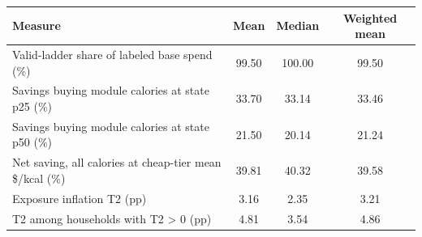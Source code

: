 \begin{tabular}{
    l
    S[table-format=2.2]
    S[table-format=3.2]
    S[table-format=2.2]
}
\toprule
Measure & {Mean} & {Median} & {Weighted mean} \\
\midrule
Valid-ladder share of labeled base spend (\%) & 99.50 & 100.00 & 99.50 \\
Savings buying module calories at state p25 (\%) & 33.70 & 33.14 & 33.46 \\
Savings buying module calories at state p50 (\%) & 21.50 & 20.14 & 21.24 \\
Net saving, all calories at cheap-tier mean \$/kcal (\%) & 39.81 & 40.32 & 39.58 \\
Exposure inflation T2 (pp) & 3.16 & 2.35 & 3.21 \\
T2 among households with T2 > 0 (pp) & 4.81 & 3.54 & 4.86 \\
\bottomrule
\end{tabular}

